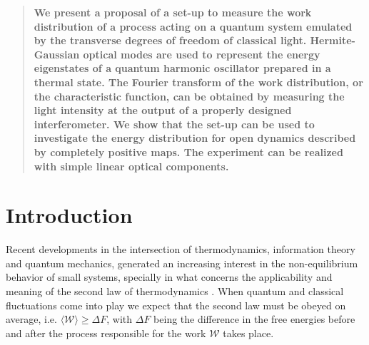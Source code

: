\documentclass[a0,portrait]{a0poster}
\begin{document}
\begin{multicols}{2} %


\color{Black} %

\begin{abstract}
\textbf{We present a proposal of a set-up to measure the work distribution of a process acting on a quantum system emulated by the transverse degrees of freedom of classical light. Hermite-Gaussian optical modes are used to represent the energy eigenstates of a quantum harmonic oscillator prepared in a thermal state. The Fourier transform of the work distribution, or the characteristic function, can be obtained by measuring the light intensity at the output of a properly designed interferometer. We show that the set-up can be used to investigate the energy distribution for open dynamics described by completely positive maps. The experiment can be realized with simple linear optical components.}
\end{abstract}


\color{Black} %

\section*{Introduction}

Recent developments in the intersection of thermodynamics, information theory and quantum mechanics, generated an increasing interest in the non-equilibrium behavior of small systems, specially in what concerns the applicability and meaning of the second law of thermodynamics \cite{Esposito,Campisi}. When quantum and classical fluctuations come into play we expect that the second law must be obeyed on average, i.e. $\langle\mathcal{W}\rangle \geq \Delta F$, with $\Delta F$ being the difference in the free energies before and after the process responsible for the work $\mathcal{W}$ takes place. 


\end{multicols}
\end{document}
